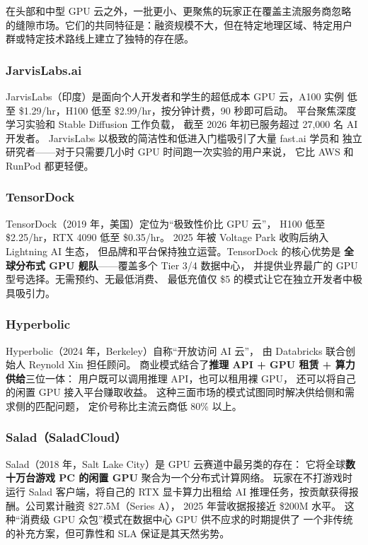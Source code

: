 在头部和中型 GPU 云之外，一批更小、更聚焦的玩家正在覆盖主流服务商忽略
的缝隙市场。它们的共同特征是：融资规模不大，但在特定地理区域、特定用户
群或特定技术路线上建立了独特的存在感。

\subsubsection{JarvisLabs.ai}
JarvisLabs（印度）是面向个人开发者和学生的超低成本 GPU 云，A100 实例
低至 \$1.29/hr，H100 低至 \$2.99/hr，按分钟计费，90 秒即可启动。
平台聚焦深度学习实验和 Stable Diffusion 工作负载，
截至 2026 年初已服务超过 27,000 名 AI 开发者。
JarvisLabs 以极致的简洁性和低进入门槛吸引了大量 fast.ai 学员和
独立研究者——对于只需要几小时 GPU 时间跑一次实验的用户来说，
它比 AWS 和 RunPod 都更轻便。

\subsubsection{TensorDock}
TensorDock（2019 年，美国）定位为``极致性价比 GPU 云''，
H100 低至 \$2.25/hr，RTX 4090 低至 \$0.35/hr。
2025 年被 Voltage Park 收购后纳入 Lightning AI 生态，
但品牌和平台保持独立运营。TensorDock 的核心优势是
\textbf{全球分布式 GPU 舰队}——覆盖多个 Tier 3/4 数据中心，
并提供业界最广的 GPU 型号选择。无需预约、无最低消费、
最低充值仅 \$5 的模式让它在独立开发者中极具吸引力。

\subsubsection{Hyperbolic}
Hyperbolic（2024 年，Berkeley）自称``开放访问 AI 云''，
由 Databricks 联合创始人 Reynold Xin 担任顾问。
商业模式结合了\textbf{推理 API + GPU 租赁 + 算力供给}三位一体：
用户既可以调用推理 API，也可以租用裸 GPU，
还可以将自己的闲置 GPU 接入平台赚取收益。
这种三面市场的模式试图同时解决供给侧和需求侧的匹配问题，
定价号称比主流云商低 80\% 以上。

\subsubsection{Salad（SaladCloud）}
Salad（2018 年，Salt Lake City）是 GPU 云赛道中最另类的存在：
它将全球\textbf{数十万台游戏 PC 的闲置 GPU} 聚合为一个分布式计算网络。
玩家在不打游戏时运行 Salad 客户端，将自己的 RTX 显卡算力出租给
AI 推理任务，按贡献获得报酬。公司累计融资 \$27.5M（Series A），
2025 年营收据报接近 \$200M 水平。
这种``消费级 GPU 众包''模式在数据中心 GPU 供不应求的时期提供了
一个非传统的补充方案，但可靠性和 SLA 保证是其天然劣势。

